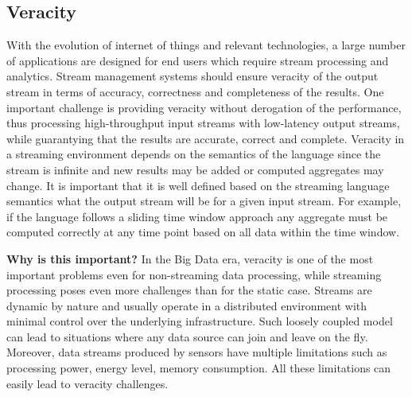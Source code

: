 \subsection{Veracity}



With the evolution of internet of things and relevant technologies, a large number of applications are designed for end users which require  stream processing and analytics. Stream management systems should ensure veracity of the output stream in terms of accuracy, correctness and completeness of the results. One important challenge is providing veracity without derogation of the performance, thus  processing high-throughput input streams with low-latency output streams, while guarantying that the results are accurate, correct and complete. Veracity in a streaming environment depends on the semantics of the language since the stream is infinite and new results may be added or computed aggregates may change. It is important that it is well defined based on the streaming language semantics what the output stream will be for a given input stream. For example, if the language follows a sliding time window approach any aggregate must be computed correctly at any time point based on all data within the time window.

\textbf{Why is this important?}
In the Big Data era, veracity is one of the most important problems even for non-streaming data processing, while streaming processing poses even more challenges than for the static case. Streams are dynamic by nature and usually operate in a distributed environment with minimal control over the underlying infrastructure. Such loosely coupled model can lead to situations where any data source can join and leave on the fly. Moreover, data streams produced by sensors have multiple limitations such as processing power, energy level, memory consumption. All these limitations can easily lead to veracity challenges.

